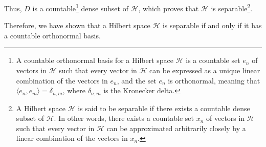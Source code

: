 \documentclass[12pt, a4paper]{article} %
\begin{document}
       Thus, $D$ is a countable\footnote{A countable orthonormal basis for a Hilbert space $\mathcal{H}$ is a countable set ${e_n}$ of vectors in $\mathcal{H}$ such that every vector in $\mathcal{H}$ can be expressed as a unique linear combination of the vectors in ${e_n}$, and the set ${e_n}$ is orthonormal, meaning that $\langle e_n, e_m\rangle = \delta_{n,m}$, where $\delta_{n,m}$ is the Kronecker delta.} dense subset of $\mathcal{H}$, which proves that $\mathcal{H}$ is separable\footnote{A Hilbert space $\mathcal{H}$ is said to be separable if there exists a countable dense subset of $\mathcal{H}$. In other words, there exists a countable set ${x_n}$ of vectors in $\mathcal{H}$ such that every vector in $\mathcal{H}$ can be approximated arbitrarily closely by a linear combination of the vectors in ${x_n}$.}. 

       Therefore, we have shown that a Hilbert space $\mathcal{H}$ is separable if and only if it has a countable orthonormal basis.

       \newpage


    



       






\end{document}
